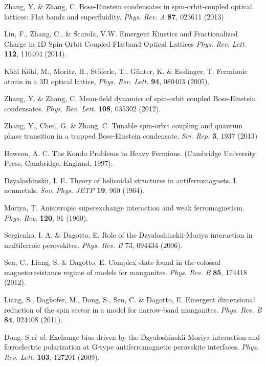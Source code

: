 \documentclass[a4paper,showpacs]{revtex4}
\begin{document}
\begin{thebibliography}{99}
 Zhang, Y. $\&$ Zhang, C. Bose-Einstein condensates in spin-orbit-coupled optical lattices: Flat bands and superfluidity. \textit{Phys. Rev. A} \textbf{87}, 023611 (2013)

 Lin, F., Zhang, C., $\&$ Scarola, V.W. Emergent Kinetics and Fractionalized Charge in 1D Spin-Orbit Coupled Flatband Optical Lattices \textit{Phys. Rev. Lett.} \textbf{112}, 110404 (2014).

 K\"{o}hl Köhl, M., Moritz, H., Stöferle, T., G\"{u}nter, K. $\&$ Esslinger, T. Fermionic atoms in a 3D optical lattice, \textit{Phys. Rev. Lett.} \textbf{94}, 080403 (2005).

 Zhang, Y. $\&$  Zhang, C. Mean-field dynamics of spin-orbit coupled Bose-Einstein condensates. \textit{Phys. Rev. Lett.} \textbf{108}, 035302 (2012).

  Zhang, Y., Chen, G. $\&$ Zhang, C. Tunable spin-orbit coupling and quantum phase transition in a trapped Bose-Einstein condensate. \textit{Sci. Rep.} \textbf{3}, 1937 (2013)

 Hewson, A. C. The Kondo Problems to Heavy Fermions. (Cambridge
University Press, Cambridge, England, 1997).

  Dzyaloshinskii, I. E. Theory of helicoidal structures in antiferromagnets. I. nonmetals. \textit{Sov. Phys. JETP} \textbf{19}, 960 (1964).

  Moriya, T. Anisotropic superexchange interaction and weak ferromagnetism. \textit{Phys. Rev.} \textbf{120}, 91 (1960).

 Sergienko, I. A. $\&$ Dagotto, E. Role of the Dzyaloshinskii-Moriya interaction in multiferroic perovskites. \textit{Phys. Rev. B} 73, 094434 (2006).

 Sen, C., Liang, S. $\&$ Dagotto, E. Complex state found in the colossal magnetoresistance regime of models for manganites. \textit{Phys. Rev. B} \textbf{85}, 174418 (2012).

 Liang, S., Daghofer, M., Dong, S., Sen, C. $\&$ Dagotto, E. Emergent dimensional reduction of the spin sector in a model for narrow-band manganites. \textit{Phys. Rev. B} \textbf{84}, 024408 (2011).

  Dong, S.\emph{et al.} Exchange bias driven by the Dzyaloshinskii-Moriya interaction and ferroelectric polarization at G-type antiferromagnetic perovskite interfaces. \textit{Phys. Rev. Lett.} \textbf{103},
127201 (2009).


\end{thebibliography}
\end{document}
